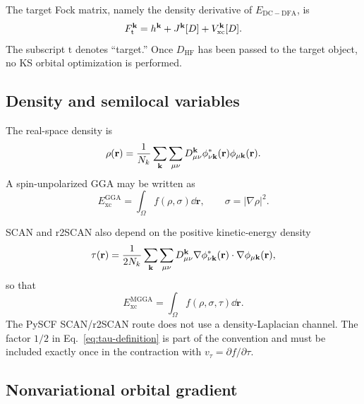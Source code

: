 The target Fock matrix, namely the density derivative of
$E_{\mathrm{DC-DFA}}$, is
\begin{equation}
  F_{\mathrm t}^{\mathbf{k}}
  =h^{\mathbf{k}}+J^{\mathbf{k}}[D]+V_{\mathrm{xc}}^{\mathbf{k}}[D].
  \label{eq:target-fock}
\end{equation}
The subscript $\mathrm t$ denotes ``target.''  Once $D_{\mathrm{HF}}$ has been
passed to the target object, no KS orbital optimization is performed.

\subsection{Density and semilocal variables}

The real-space density is
\begin{equation}
  \rho(\mathbf r)
  =\frac{1}{N_k}\sum_{\mathbf{k}}\sum_{\mu\nu}
    D_{\mu\nu}^{\mathbf{k}}
    \phi_{\nu\mathbf{k}}^{*}(\mathbf r)
    \phi_{\mu\mathbf{k}}(\mathbf r).
  \label{eq:real-space-density}
\end{equation}
A spin-unpolarized GGA may be written as
\begin{equation}
  E_{\mathrm{xc}}^{\mathrm{GGA}}
  =\int_\Omega
    f\!\left(\rho,\sigma\right)\dd\mathbf r,
  \qquad
  \sigma=|\nabla\rho|^2.
  \label{eq:gga-energy}
\end{equation}

SCAN and r2SCAN also depend on the positive kinetic-energy density
\begin{equation}
  \tau(\mathbf r)
  =\frac{1}{2N_k}\sum_{\mathbf{k}}\sum_{\mu\nu}
   D_{\mu\nu}^{\mathbf{k}}
   \nabla\phi_{\nu\mathbf{k}}^{*}(\mathbf r)\cdot
   \nabla\phi_{\mu\mathbf{k}}(\mathbf r),
  \label{eq:tau-definition}
\end{equation}
so that
\begin{equation}
  E_{\mathrm{xc}}^{\mathrm{MGGA}}
  =\int_\Omega f(\rho,\sigma,\tau)\dd\mathbf r.
  \label{eq:mgga-energy}
\end{equation}
The PySCF SCAN/r2SCAN route does not use a density-Laplacian channel.  The
factor $1/2$ in Eq.~\eqref{eq:tau-definition} is part of the convention and
must be included exactly once in the contraction with
$v_\tau=\partial f/\partial\tau$.

\subsection{Nonvariational orbital gradient}

